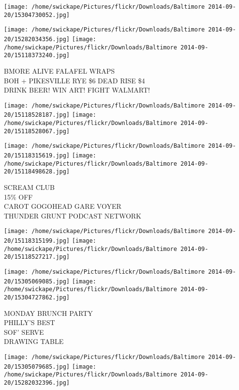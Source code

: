 \documentclass[10pt,letterpaper]{article}
\begin{document}
\texttt{[image: /home/swickape/Pictures/flickr/Downloads/Baltimore 2014-09-20/15304730052.jpg]}

\vspace{0.25in}
\texttt{[image: /home/swickape/Pictures/flickr/Downloads/Baltimore 2014-09-20/15282034356.jpg]}
\texttt{[image: /home/swickape/Pictures/flickr/Downloads/Baltimore 2014-09-20/15118373240.jpg]}

BMORE ALIVE FALAFEL WRAPS\\
BOH + PIKESVILLE RYE \$6 DEAD RISE \$4\\
DRINK BEER! WIN ART! FIGHT WALMART!\\
\pagebreak

\texttt{[image: /home/swickape/Pictures/flickr/Downloads/Baltimore 2014-09-20/15118528187.jpg]}
\texttt{[image: /home/swickape/Pictures/flickr/Downloads/Baltimore 2014-09-20/15118528067.jpg]}

\texttt{[image: /home/swickape/Pictures/flickr/Downloads/Baltimore 2014-09-20/15118315619.jpg]}
\texttt{[image: /home/swickape/Pictures/flickr/Downloads/Baltimore 2014-09-20/15118498628.jpg]}

SCREAM CLUB\\
15\% OFF\\
CAROT GOGOHEAD GARE VOYER\\
THUNDER GRUNT PODCAST NETWORK\\
\pagebreak

\texttt{[image: /home/swickape/Pictures/flickr/Downloads/Baltimore 2014-09-20/15118315199.jpg]}
\texttt{[image: /home/swickape/Pictures/flickr/Downloads/Baltimore 2014-09-20/15118527217.jpg]}

\texttt{[image: /home/swickape/Pictures/flickr/Downloads/Baltimore 2014-09-20/15305069085.jpg]}
\texttt{[image: /home/swickape/Pictures/flickr/Downloads/Baltimore 2014-09-20/15304727862.jpg]}

MONDAY BRUNCH PARTY\\
PHILLY'S BEST\\
SOF' SERVE\\
DRAWING TABLE\\
\pagebreak

\texttt{[image: /home/swickape/Pictures/flickr/Downloads/Baltimore 2014-09-20/15305079685.jpg]}
\texttt{[image: /home/swickape/Pictures/flickr/Downloads/Baltimore 2014-09-20/15282032396.jpg]}
\end{document}
